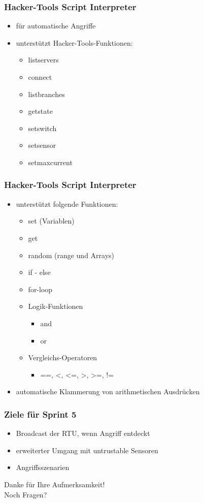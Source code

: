 \documentclass{beamer}
\begin{document}
\begin{frame}
	\frametitle{Hacker-Tools Script Interpreter}
	\begin{itemize}
		\item für automatische Angriffe
		\item unterstützt Hacker-Tools-Funktionen:
			\begin{itemize}
				\item listservers
				\item connect
				\item listbranches
				\item getstate
				\item setswitch
				\item setsensor
				\item setmaxcurrent
			\end{itemize}
	\end{itemize}
\end{frame}

\begin{frame}
	\frametitle{Hacker-Tools Script Interpreter}
	\begin{itemize}
		\item unterstützt folgende Funktionen:
			\begin{itemize}
				\item set (Variablen)
				\item get
				\item random (range und Arrays)
				\item if - else
				\item for-loop
				\item Logik-Funktionen
					\begin{itemize}
						\item and
						\item or
					\end{itemize}
				\item Vergleichs-Operatoren
					\begin{itemize}
					 	\item ==, <, <=, >, >=, !=
					\end{itemize}
			\end{itemize}
		\item automatische Klammerung von arithmetischen Ausdrücken
	\end{itemize}
\end{frame}

\begin{frame}
	\frametitle{Ziele für Sprint 5}
	\begin{itemize}
		\item Broadcast der RTU, wenn Angriff entdeckt
		\item erweiterter Umgang mit untrustable Sensoren
		\item Angriffsszenarien
	\end{itemize}
\end{frame}

\begin{frame}
	\centering
	Danke für Ihre Aufmerksamkeit! \\
	Noch Fragen?
\end{frame}
\end{document}
